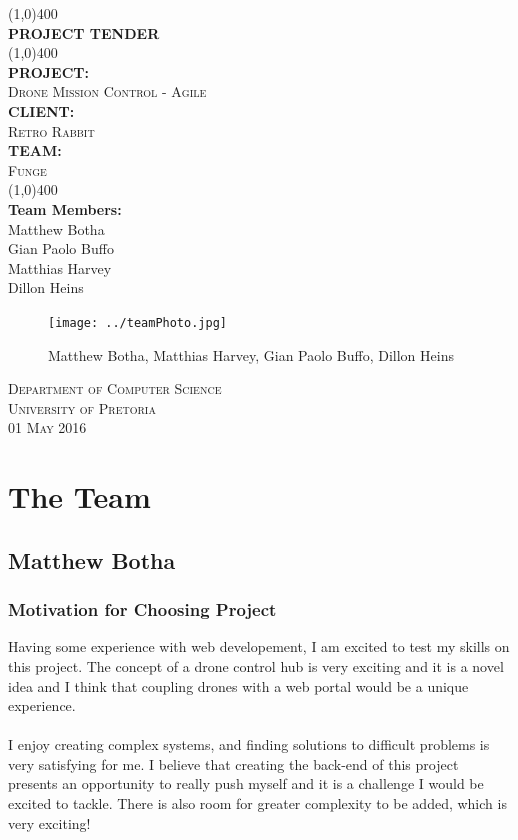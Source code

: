 \documentclass{article}
\begin{document}
\begin{titlepage}
	\begin{center}
		\line(1,0){400}\\
		[6mm]
		\huge{\bfseries PROJECT TENDER}\\
		[2mm]
		\line(1,0){400}\\
		[5mm]
		\large\textbf{PROJECT:}\\\textsc{Drone Mission Control - Agile}\\
		[3mm]
		\large\textbf{CLIENT:}\\\textsc{Retro Rabbit}\\
		[3mm]
		\large \textbf{TEAM:}\\\textsc{Funge}\\
		\line(1,0){400}\\
		[5mm]
		\large \textbf{Team Members:}\\
		[3mm]
		\large Matthew Botha\\
		\large Gian Paolo Buffo\\
		\large Matthias Harvey\\
        \large Dillon Heins\\[3mm]
		\begin{figure}[H]
			\centering
			\texttt{[image: ../teamPhoto.jpg]}
			\caption{Matthew Botha, Matthias Harvey, Gian Paolo Buffo, Dillon Heins}
		\end{figure}
    \end{center}

	\vspace{7mm}

    \begin{flushright}
        \textsc{\large Department of Computer Science\\
        University of Pretoria\\
        01 May 2016\\}
    \end{flushright}
\end{titlepage}

\section{The Team}
\subsection{Matthew Botha}
	
	\subsubsection{Motivation for Choosing Project}
	Having some experience with web developement, I am excited to test my skills on this project. The concept of a drone control hub is very exciting and it is a novel idea and I think that coupling drones with a web portal would be a unique experience.
	\\\\
	I enjoy creating complex systems, and finding solutions to difficult problems is very satisfying for me. I believe that creating the back-end of this project presents an opportunity to really push myself and it is a challenge I would be excited to tackle. There is also room for greater complexity to be added, which is very exciting!
	
\end{document}
